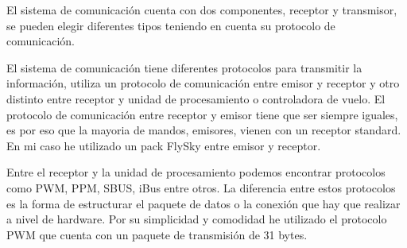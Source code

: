 
	El sistema de comunicación cuenta con dos componentes, receptor y transmisor, se pueden elegir diferentes tipos teniendo en cuenta su protocolo de comunicación. 
	
	El sistema de comunicación tiene diferentes protocolos para transmitir la información, utiliza un protocolo de comunicación entre emisor y receptor y otro distinto entre receptor y unidad de procesamiento o controladora de vuelo.
	El protocolo de comunicación entre receptor y emisor tiene que ser siempre iguales, es por eso que la mayoria de mandos, emisores, vienen con un receptor standard. En mi caso he utilizado un pack FlySky entre emisor y receptor.\cite{Eric2017}
	
	Entre el receptor y la unidad de procesamiento podemos encontrar protocolos como PWM, PPM, SBUS, iBus entre otros. La diferencia entre estos protocolos es la forma de estructurar el paquete de datos o la conexión que hay que realizar a nivel de hardware. Por su simplicidad y comodidad he utilizado el protocolo PWM que cuenta con un paquete de transmisión de 31 bytes.
	

